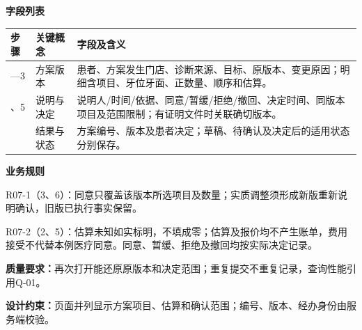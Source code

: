 \documentclass[UTF8,a4paper,zihao=-4,fontset=none]{ctexart}
\begin{document}
\noindent\textbf{字段列表}\par
{\setlength{\tabcolsep}{3pt}\renewcommand{\arraystretch}{1.04}
\noindent\begin{tabular}{@{}>{\raggedright\arraybackslash}p{1.2cm}>{\raggedright\arraybackslash}p{2.2cm}>{\raggedright\arraybackslash}p{12.3cm}@{}}
\toprule
步骤 & 关键概念 & 字段及含义 \\ \midrule
1—3 & 方案版本 & 患者、方案发生门店、诊断来源、目标、原版本、变更原因；明细含项目、牙位牙面、正数量、顺序和估算。 \\
4、5 & 说明与决定 & 说明人/时间/依据、同意/暂缓/拒绝/撤回、决定时间、同版本项目及范围限制；有证明文件时关联确切版本。 \\
6 & 结果与状态 & 方案编号、版本及患者决定；草稿、待确认及决定后的适用状态分别保存。 \\
\bottomrule
\end{tabular}\par}
\smallskip
\noindent\textbf{业务规则}\par
\noindent R07-1（3、6）：同意只覆盖该版本所选项目及数量；实质调整须形成新版重新说明确认，旧版已执行事实保留。\par
\noindent R07-2（2、5）：估算未知如实标明，不填成零；估算及报价均不产生账单，费用接受不代替本例医疗同意。同意、暂缓、拒绝及撤回均按实际决定记录。\par
\smallskip
\noindent\textbf{质量要求：}再次打开能还原原版本和决定范围；重复提交不重复记录，查询性能引用Q-01。\par
\noindent\textbf{设计约束：}页面并列显示方案项目、估算和确认范围；编号、版本、经办身份由服务端校验。\par
\endgroup
\clearpage
\end{document}
